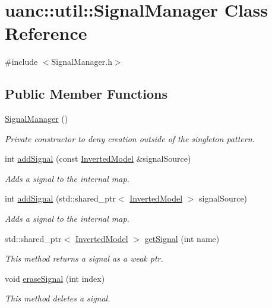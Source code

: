 \hypertarget{classuanc_1_1util_1_1_signal_manager}{}\section{uanc\+:\+:util\+:\+:Signal\+Manager Class Reference}
\label{classuanc_1_1util_1_1_signal_manager}


{\ttfamily \#include $<$Signal\+Manager.\+h$>$}

\subsection*{Public Member Functions}
\begin{DoxyCompactItemize}
\item 
\hyperlink{classuanc_1_1util_1_1_signal_manager_abc5fe781a15e9f7dfd5976055101421d}{Signal\+Manager} ()
\begin{DoxyCompactList}\small\item\em Private constructor to deny creation outside of the singleton pattern. \end{DoxyCompactList}\item 
int \hyperlink{classuanc_1_1util_1_1_signal_manager_a23ca36b1dc644f2bdb218c95aa548a22}{add\+Signal} (const \hyperlink{classuanc_1_1amv_1_1_inverted_model}{Inverted\+Model} \&signal\+Source)
\begin{DoxyCompactList}\small\item\em Adds a signal to the internal map. \end{DoxyCompactList}\item 
int \hyperlink{classuanc_1_1util_1_1_signal_manager_a2e78bbe03560797e5f8d289fad36aa9f}{add\+Signal} (std\+::shared\+\_\+ptr$<$ \hyperlink{classuanc_1_1amv_1_1_inverted_model}{Inverted\+Model} $>$ signal\+Source)
\begin{DoxyCompactList}\small\item\em Adds a signal to the internal map. \end{DoxyCompactList}\item 
std\+::shared\+\_\+ptr$<$ \hyperlink{classuanc_1_1amv_1_1_inverted_model}{Inverted\+Model} $>$ \hyperlink{classuanc_1_1util_1_1_signal_manager_a57b20729a18cf0b1c119a4fe6eef398a}{get\+Signal} (int name)
\begin{DoxyCompactList}\small\item\em This method returns a signal as a weak ptr. \end{DoxyCompactList}\item 
void \hyperlink{classuanc_1_1util_1_1_signal_manager_a26920917057ae9c917703a1143d832ca}{erase\+Signal} (int index)
\begin{DoxyCompactList}\small\item\em This method deletes a signal. \end{DoxyCompactList}\end{DoxyCompactItemize}
